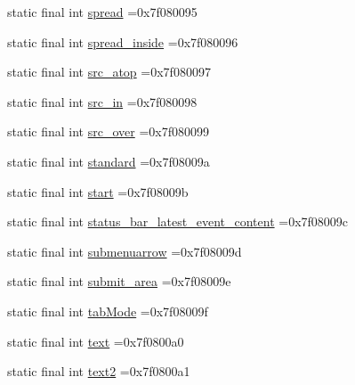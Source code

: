\begin{DoxyCompactItemize}
\item 
static final int \mbox{\hyperlink{classbr_1_1unb_1_1cic_1_1mp_1_1marketmaster_1_1test_1_1R_1_1id_aa2bbf11f0fc60728df4d7ccdb4b79e52}{spread}} =0x7f080095
\item 
static final int \mbox{\hyperlink{classbr_1_1unb_1_1cic_1_1mp_1_1marketmaster_1_1test_1_1R_1_1id_a169a6ad7fce42725b08530dc1317dbe7}{spread\+\_\+inside}} =0x7f080096
\item 
static final int \mbox{\hyperlink{classbr_1_1unb_1_1cic_1_1mp_1_1marketmaster_1_1test_1_1R_1_1id_a7e891b16bfb6347b8a267f4e87625677}{src\+\_\+atop}} =0x7f080097
\item 
static final int \mbox{\hyperlink{classbr_1_1unb_1_1cic_1_1mp_1_1marketmaster_1_1test_1_1R_1_1id_a08f12d411f978420c32ffa9bc1ee73a5}{src\+\_\+in}} =0x7f080098
\item 
static final int \mbox{\hyperlink{classbr_1_1unb_1_1cic_1_1mp_1_1marketmaster_1_1test_1_1R_1_1id_a240bd7fb3496dac4673bb015a442f15b}{src\+\_\+over}} =0x7f080099
\item 
static final int \mbox{\hyperlink{classbr_1_1unb_1_1cic_1_1mp_1_1marketmaster_1_1test_1_1R_1_1id_af822816c476a16ff942e8569c221cce2}{standard}} =0x7f08009a
\item 
static final int \mbox{\hyperlink{classbr_1_1unb_1_1cic_1_1mp_1_1marketmaster_1_1test_1_1R_1_1id_afd6c50fd890ce1e21f428e90bdc1e015}{start}} =0x7f08009b
\item 
static final int \mbox{\hyperlink{classbr_1_1unb_1_1cic_1_1mp_1_1marketmaster_1_1test_1_1R_1_1id_aec84354f82fb64da07e5b1364bd11e2b}{status\+\_\+bar\+\_\+latest\+\_\+event\+\_\+content}} =0x7f08009c
\item 
static final int \mbox{\hyperlink{classbr_1_1unb_1_1cic_1_1mp_1_1marketmaster_1_1test_1_1R_1_1id_a79bc51e7e2430e073344dd8af7e5de44}{submenuarrow}} =0x7f08009d
\item 
static final int \mbox{\hyperlink{classbr_1_1unb_1_1cic_1_1mp_1_1marketmaster_1_1test_1_1R_1_1id_ae7640f8ee16bbce31bf0be08a3f2c5f2}{submit\+\_\+area}} =0x7f08009e
\item 
static final int \mbox{\hyperlink{classbr_1_1unb_1_1cic_1_1mp_1_1marketmaster_1_1test_1_1R_1_1id_a99844921b3ca560117dcaa2f536ded02}{tab\+Mode}} =0x7f08009f
\item 
static final int \mbox{\hyperlink{classbr_1_1unb_1_1cic_1_1mp_1_1marketmaster_1_1test_1_1R_1_1id_a3145daf0bae542b36176a147b17954a6}{text}} =0x7f0800a0
\item 
static final int \mbox{\hyperlink{classbr_1_1unb_1_1cic_1_1mp_1_1marketmaster_1_1test_1_1R_1_1id_a153a75258307b55d60b7706b84abe402}{text2}} =0x7f0800a1

\end{DoxyCompactItemize}
